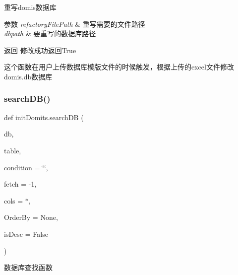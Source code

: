 重写domis数据库 


\begin{DoxyParams}{参数}
{\em refactory\+File\+Path} & 重写需要的文件路径 \\
\hline
{\em dbpath} & 要重写的数据库路径 \\
\hline
\end{DoxyParams}
\begin{DoxyReturn}{返回}
修改成功返回\+True
\end{DoxyReturn}
这个函数在用户上传数据库模版文件的时候触发，根据上传的excel文件修改domis.\+db数据库 \mbox{\label{group___xE6_x95_xB0_xE6_x8D_xAE_xE5_xBA_x93_xE6_x93_x8D_xE4_xBD_x9C_gab0b2210b38aa2decfc4f09e122f949bf}} 
\subsubsection{\texorpdfstring{searchDB()}{searchDB()}}
{\footnotesize\ttfamily def init\+Domits.\+search\+DB (\begin{DoxyParamCaption}\item[{}]{db,  }\item[{}]{table,  }\item[{}]{condition = {\ttfamily \char`\"{}\char`\"{}},  }\item[{}]{fetch = {\ttfamily -\/1},  }\item[{}]{cols = {\ttfamily \textquotesingle{}$\ast$\textquotesingle{}},  }\item[{}]{Order\+By = {\ttfamily None},  }\item[{}]{is\+Desc = {\ttfamily False} }\end{DoxyParamCaption})}



数据库查找函数 


